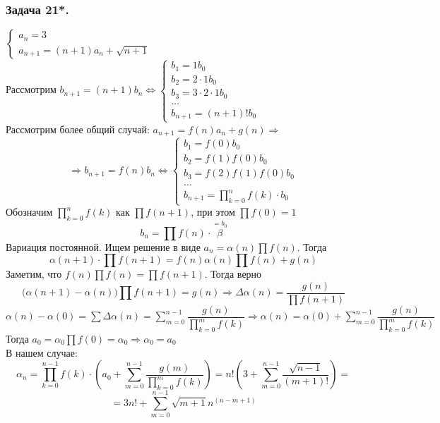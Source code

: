 \documentclass[12pt, letterpaper, twoside]{article}
\begin{document}
    \subsubsection*{Задача 21*.}
    $\begin{cases}
        a_n = 3\\
        a_{n + 1} = (n + 1)a_n + \sqrt{n + 1}
    \end{cases}$\\
    Рассмотрим $b_{n + 1} = (n + 1)b_n\Leftrightarrow \begin{cases}
        b_1 = 1b_0\\
        b_2 = 2\cdot 1 b_0\\
        b_3 = 3\cdot 2\cdot 1b_0\\
        \dots\\
        b_{n + 1} = (n + 1)!b_0
    \end{cases}$\\
    Рассмотрим более общий случай: $a_{n + 1} = f(n) a_n + g(n)\Rightarrow$
    \[\Rightarrow b_{n + 1} = f(n)b_n\Leftrightarrow\begin{cases}
        b_1 = f(0) b_0\\
        b_2 = f(1) f(0) b_0\\
        b_3 = f(2) f(1) f(0) b_0\\
        \dots\\
        b_{n + 1} = \prod\limits_{k = 0}^{n}f(k)\cdot b_0
    \end{cases}\]
    Обозначим $\prod\limits_{k = 0}^{n}f(k)$ как $\prod f(n + 1)$, при этом $\prod f(0) = 1$
    \[b_n = \prod f(n)\cdot \overset{=b_0}{\beta}\]
    Вариация постоянной. Ищем решение в виде $a_n = \alpha(n)\prod f(n)$. Тогда
    \[\alpha (n + 1)\cdot \prod f(n + 1) = f(n)\alpha (n)\prod f(n) + g(n)\]
    Заметим, что $f(n)\prod f(n) = \prod f(n + 1)$. Тогда верно
    \[\big(\alpha(n + 1) - \alpha(n)\big) \prod f(n + 1) = g(n)\Rightarrow \Delta \alpha(n) = \dfrac{g(n)}{\prod f(n + 1)}\]
    $\alpha(n) - \alpha(0) = \sum \Delta \alpha (n) = \sum\limits_{m = 0}^{n - 1} \dfrac{g(n)}{\prod\limits_{k = 0}^{m}f(k)}\Rightarrow \alpha(n) = \alpha(0) + \sum_{m = 0}^{n - 1}\dfrac{g(n)}{\prod\limits_{k = 0}^{m}f(k)}$\\
    Тогда $a_0 = \alpha_0 \prod f(0) = \alpha_0 \Rightarrow \alpha_0 = a_0$\\
    В нашем случае:
    \[\alpha_n = \prod\limits_{k = 0}^{n - 1}f(k)\cdot \left( a_0 + \sum_{m = 0}^{n - 1}\dfrac{g(m)}{\prod\limits_{k = 0}^{m}f(k)} \right) = n!\left(3 + \sum\limits_{m = 0}^{n - 1}\dfrac{\sqrt{n - 1}}{(m + 1)!}\right)=\]
    \[= 3n! + \sum\limits_{m = 0}^{n - 1}\sqrt{m + 1}n^{(n - m + 1)}\]
\end{document}
